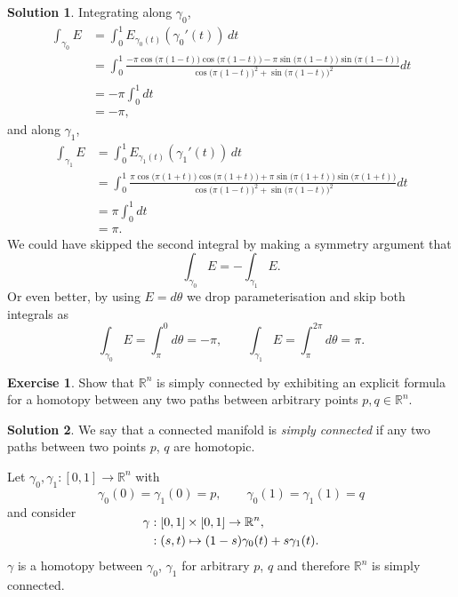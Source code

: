 \documentclass[11pt, a4paper]{report}
\theoremstyle{definition}
\newtheorem{ex}{Exercise}[part]
\newtheorem{sol}{Solution}[part]
\begin{document}
\begin{sol}
Integrating along $\gamma_0$,
\begin{align*}
    \int_{\gamma_0} E &= \int_0^1 E_{\gamma_0(t)}(\gamma_0'(t)) \, dt \\
        &= \int_0^1 \frac{-\pi \cos \bigl( \pi(1 - t) \bigr) \cos \bigl( \pi(1 - t) \bigr)
                          - \pi \sin \bigl( \pi(1 - t) \bigr) \sin \bigl( \pi(1 - t) \bigr)}
                         {{\cos \bigl( \pi(1 - t) \bigr)}^2 + {\sin \bigl( \pi(1 - t) \bigr)}^2} dt \\
        &= -\pi \int_0^1 dt \\
        &= -\pi,
\end{align*}
and along $\gamma_1$,
\begin{align*}
    \int_{\gamma_1} E &= \int_0^1 E_{\gamma_1(t)}(\gamma_1'(t)) \, dt \\
        &= \int_0^1 \frac{\pi \cos \bigl( \pi(1 + t) \bigr) \cos \bigl( \pi(1 + t) \bigr)
                          + \pi \sin \bigl( \pi(1 + t) \bigr) \sin \bigl( \pi(1 + t) \bigr)}
                         {{\cos \bigl( \pi(1 - t) \bigr)}^2 + {\sin \bigl( \pi(1 - t) \bigr)}^2} dt \\
        &= \pi \int_0^1 dt \\
        &= \pi.
\end{align*}
We could have skipped the second integral by making a symmetry argument that
\[
    \int_{\gamma_0} E = -\int_{\gamma_1} E.
\]
Or even better, by using $E = d\theta$ we drop parameterisation and skip both integrals as
\[
    \int_{\gamma_0} E = \int_\pi^0 d\theta = -\pi, \qquad
    \int_{\gamma_1} E = \int_\pi^{2\pi} d\theta = \pi.
\]

\end{sol}

\begin{ex}

Show that $\mathbb{R}^n$ is simply connected by exhibiting an explicit formula for a homotopy between any two paths between arbitrary points $p, q \in \mathbb{R}^n$.

\end{ex}

\begin{sol}

We say that a connected manifold is \emph{simply connected} if any two paths between two points $p$, $q$ are homotopic.

Let $\gamma_0, \gamma_1: [0, 1] \to \mathbb{R}^n$ with
\[
    \gamma_0(0) = \gamma_1(0) = p, \qquad
    \gamma_0(1) = \gamma_1(1) = q
\]
and consider
\begin{align*}
    \SwapAboveDisplaySkip
    \gamma &: [0, 1] \times [0, 1] \to \mathbb{R}^n, \\
           &: (s, t) \mapsto (1 - s)\gamma_0(t) + s \gamma_1(t).
\end{align*}
$\gamma$ is a homotopy between $\gamma_0$, $\gamma_1$ for arbitrary $p$, $q$ and therefore $\mathbb{R}^n$ is simply connected.

\end{sol}
\end{document}
